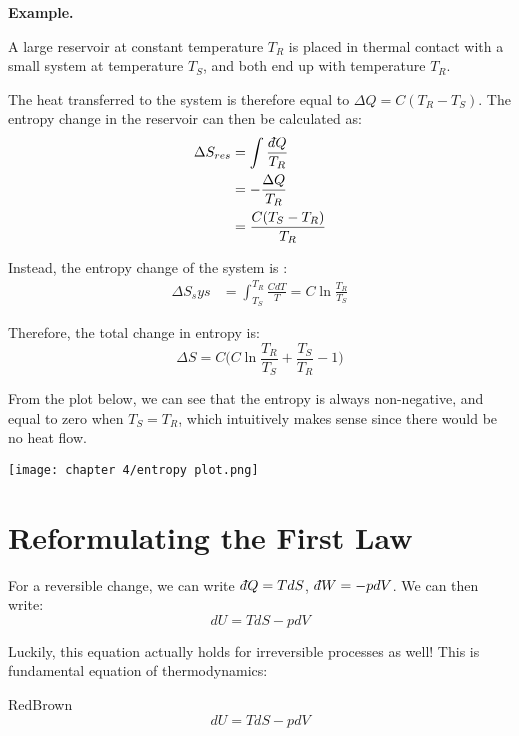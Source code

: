 \documentclass[a4paper,11pt,oneside]{book}
\newcommand{\dbar}{d\hspace*{-0.08em}\bar{}\hspace*{0.1em}}
\begin{document}
\begin{strategy}
\textbf{Example.}
\end{strategy}
\begin{mdframed}
A large reservoir at constant temperature $T_R$ is placed in thermal contact with a small system at temperature $T_S$, and both end up with temperature $T_R$. 


The heat transferred to the system is therefore equal to $\Delta Q =C(T_R-T_S)$. The entropy change in the reservoir can then be calculated as:
\begin{align}
    \Delta S_{res} &= \int \frac{\dbar Q}{T_R} \\
                 &= -\frac{\Delta Q}{T_R}\\
                 &= \frac{C(T_S-T_R)}{T_R}
\end{align}

Instead, the entropy change of the system is :
\begin{align}
    \Delta S_sys &= \int_{T_S}^{T_R} \frac{C dT}{T} = C \ln \frac{T_R}{T_S}
\end{align}

Therefore, the total change in entropy is:
\begin{equation}
    \Delta S = C \bigg(C \ln \frac{T_R}{T_S}+ \frac{T_S}{T_R} - 1\bigg)
\end{equation}

From the plot below, we can see that the entropy is always non-negative, and equal to zero when $T_S = T_R$, which intuitively makes sense since there would be no heat flow.  

\begin{center}
\begin{minipage}[h!]{6cm}
    \centering
        \texttt{[image: chapter 4/entropy plot.png]}
    \end{minipage}
\end{center}
\end{mdframed}

\section{Reformulating the First Law}
For a reversible change, we can write $\dbar Q = T dS$, $\dbar W = - p dV$. We can then write:
\begin{equation}
    dU = T dS - p dV
\end{equation}

Luckily, this equation actually holds for irreversible processes as well! This is fundamental equation of thermodynamics:
\begin{mybox}{RedBrown}{\textbf{}}
$$\boxed{dU = T dS - p dV}$$
\end{mybox}
\end{document}
